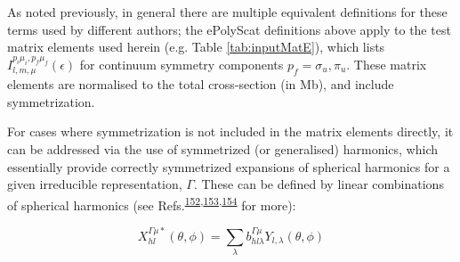 \documentclass[10pt]{article}
\begin{document}
As noted previously, in general there are multiple equivalent definitions for these terms used by different authors; the ePolyScat definitions above apply to the test matrix elements used herein (e.g. Table \ref{tab:inputMatE}), which lists $I_{l,m,\mu}^{p_{i}\mu_{i},p_{f}\mu_{f}}(\epsilon)$ for continuum symmetry components $p_f=\sigma_u,\pi_u$. These matrix elements are normalised to the total cross-section (in Mb), and include symmetrization. 



For cases where symmetrization is not included in the matrix elements directly, it can be addressed via the use of symmetrized (or generalised) harmonics, which essentially provide correctly symmetrized expansions of spherical harmonics for a given irreducible representation, $\Gamma$. These can be defined by linear combinations of spherical harmonics (see Refs.\textsuperscript{\hyperref[csl:152]{152},\hyperref[csl:153]{153},\hyperref[csl:154]{154}} for more):

\begin{equation}
X_{hl}^{\Gamma\mu*}(\theta,\phi)=\sum_{\lambda}b_{hl\lambda}^{\Gamma\mu}Y_{l,\lambda}(\theta,\phi)\label{eq:symm-harmonics}
\end{equation}
\end{document}
